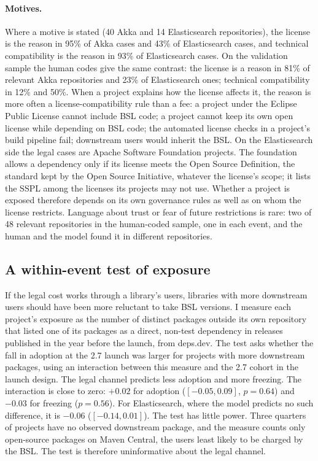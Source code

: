 \documentclass[11pt]{article}
\begin{document}
\paragraph{Motives.} Where a motive is stated (40 Akka and 14 Elasticsearch repositories), the license is the reason in 95\% of Akka cases and 43\% of Elasticsearch cases, and technical compatibility is the reason in 93\% of Elasticsearch cases. On the validation sample the human codes give the same contrast: the license is a reason in 81\% of relevant Akka repositories and 23\% of Elasticsearch ones; technical compatibility in 12\% and 50\%. When a project explains how the license affects it, the reason is more often a license-compatibility rule than a fee: a project under the Eclipse Public License cannot include BSL code; a project cannot keep its own open license while depending on BSL code; the automated license checks in a project's build pipeline fail; downstream users would inherit the BSL. On the Elasticsearch side the legal cases are Apache Software Foundation projects. The foundation allows a dependency only if its license meets the Open Source Definition, the standard kept by the Open Source Initiative, whatever the license's scope; it lists the SSPL among the licenses its projects may not use. Whether a project is exposed therefore depends on its own governance rules as well as on whom the license restricts. Language about trust or fear of future restrictions is rare: two of 48 relevant repositories in the human-coded sample, one in each event, and the human and the model found it in different repositories.

\subsection{A within-event test of exposure}

If the legal cost works through a library's users, libraries with more downstream users should have been more reluctant to take BSL versions. I measure each project's exposure as the number of distinct packages outside its own repository that listed one of its packages as a direct, non-test dependency in releases published in the year before the launch, from deps.dev. The test asks whether the fall in adoption at the 2.7 launch was larger for projects with more downstream packages, using an interaction between this measure and the 2.7 cohort in the launch design. The legal channel predicts less adoption and more freezing. The interaction is close to zero: $+0.02$ for adoption ($[-0.05,0.09]$, $p=0.64$) and $-0.03$ for freezing ($p=0.56$). For Elasticsearch, where the model predicts no such difference, it is $-0.06$ ($[-0.14,0.01]$). The test has little power. Three quarters of projects have no observed downstream package, and the measure counts only open-source packages on Maven Central, the users least likely to be charged by the BSL. The test is therefore uninformative about the legal channel.
\end{document}
